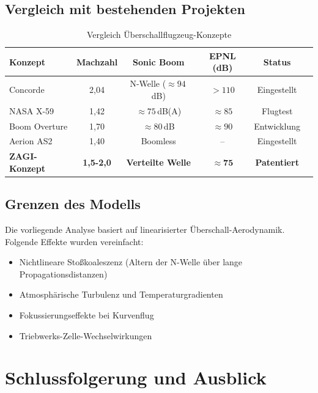 ﻿\documentclass[12pt,a4paper]{article}
\theoremstyle{definition}
\theoremstyle{remark}
\begin{document}
\subsection{Vergleich mit bestehenden Projekten}

\begin{table}[H]
  \centering
  \caption{Vergleich Überschallflugzeug-Konzepte}
  \label{tab:vergleich}
  \begin{tabular}{lccccl}
    \toprule
    Konzept & Machzahl & Sonic Boom & EPNL (dB) & Status \\
    \midrule
    Concorde & 2,04 & N-Welle ($\approx\!94\,$dB) & $>110$ & Eingestellt \\
    NASA X-59 & 1,42 & $\approx\!75\,$dB(A) & $\approx\!85$ & Flugtest \\
    Boom Overture & 1,70 & $\approx\!80\,$dB & $\approx\!90$ & Entwicklung \\
    Aerion AS2 & 1,40 & Boomless & -- & Eingestellt \\
    \textbf{ZAGI-Konzept} & \textbf{1,5-2,0} & \textbf{Verteilte Welle} & $\mathbf{\approx 75}$ & \textbf{Patentiert} \\
    \bottomrule
  \end{tabular}
\end{table}

\subsection{Grenzen des Modells}

Die vorliegende Analyse basiert auf linearisierter Überschall-Aerodynamik. Folgende
Effekte wurden vereinfacht:
\begin{itemize}
  \item Nichtlineare Stoßkoaleszenz (Altern der N-Welle über lange Propagationsdistanzen)
  \item Atmosphärische Turbulenz und Temperaturgradienten
  \item Fokussierungseffekte bei Kurvenflug
  \item Triebwerks-Zelle-Wechselwirkungen
\end{itemize}

\section{Schlussfolgerung und Ausblick}
\label{sec:schluss}
\end{document}
